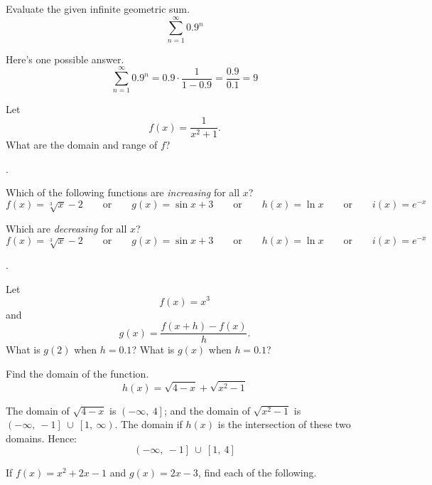 \documentclass[12pt,addpoints, answers, fleqn]{exam}
\begin{document}
\begin{questions}
\begin{solution}
\end{solution}
\question Evaluate the given infinite geometric sum.
\[
\sum\limits_{n = 1}^{\infty} {0.9^n} 
\]
\begin{solution} Here's one possible answer.
\[
\sum\limits_{n = 1}^{\infty} {0.9^n} = 0.9 \cdot \frac{1}{1-0.9} = \frac{0.9}{0.1} = \boxed{9}
\]
\end{solution}
\question Let
\[
f \left( x \right) = \frac{1}{x^2 + 1}.
\]
What are the domain and range of $f$?
\begin{solution}
\fbox{Domain: $\mathbb{R}$; Range: $\left( 0, \ 1 \right]$}.
\end{solution}
\question Which of the following functions are \emph{increasing} for all $x$?
\[
f \left( x \right) = \sqrt[3]{x} - 2  \qquad \mbox{or} \qquad g \left( x \right) = \sin x + 3  \qquad \mbox{or} \qquad h \left( x \right) = \ln x  \qquad \mbox{or} \qquad i \left( x \right) = e^{-x}
\]
\begin{solution}
\end{solution}
\question Which are \emph{decreasing} for all $x$?
\[
f \left( x \right) = \sqrt[3]{x} - 2  \qquad \mbox{or} \qquad g \left( x \right) = \sin x + 3  \qquad \mbox{or} \qquad h \left( x \right) = \ln x  \qquad \mbox{or} \qquad i \left( x \right) = e^{-x}
\]
\begin{solution}
.
\end{solution}
\question Let
\[
f \left( x \right) = x^3
\]
and
\[
g \left( x \right) = \frac{f \left( x + h\right) - f \left( x \right)}{h}.
\]
What is $g \left( 2 \right)$ when $h=0.1$? What is $g \left( x \right)$ when $h=0.1$? 
\begin{solution}
\end{solution}
\question Find the domain of the function.
\[
h\left( x \right) = \sqrt{4-x} + \sqrt{x^2-1}
\]
\begin{solution}
The domain of $\sqrt{4-x}$ is $\left( - \infty, \ 4 \right]$; and the domain of $\sqrt{x^2-1}$ is $\left( -\infty, \ -1 \right] \ \cup \ \left[1, \ \infty \right)$. The domain if $h\left( x \right)$ is the intersection of these two domains. Hence:
\[
\boxed{\left( -\infty, \ -1 \right] \ \cup \ \left[1, \ 4 \right]}
\]
\end{solution}
\question If $f \left( x \right) = x^2 + 2x - 1$ and $g \left( x \right) = 2x-3$, find each of the following.
\begin{parts}

\end{parts}
\end{questions}
\end{document}
